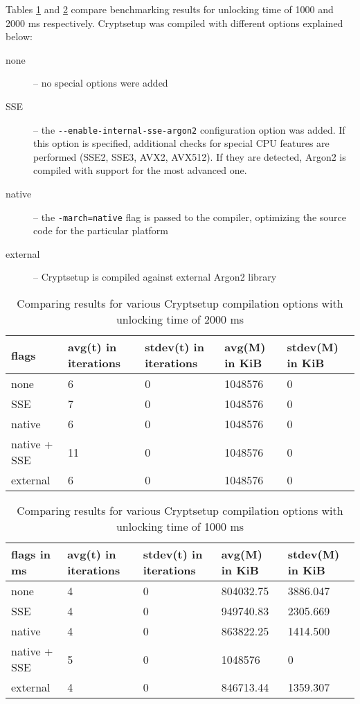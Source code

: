\documentclass[nolof]{fithesis3}
\begin{document}
\FloatBarrier

Tables \ref{tab:comp2000} and \ref{tab:comp1000} compare benchmarking results for unlocking time of 1000 and 2000 ms respectively. Cryptsetup was compiled with different options explained below:

\begin{description}
\item[none] -- no special options were added

\item[SSE] -- the \verb+--enable-internal-sse-argon2+ configuration option was added. If this option is specified, additional checks for special CPU features are performed (SSE2, SSE3, AVX2, AVX512). If they are detected, Argon2 is compiled with support for the most advanced one.

\item[native] -- the \verb+-march=native+ flag is passed to the compiler, optimizing the source code for the particular platform

\item[external] -- Cryptsetup is compiled against external Argon2 library
\end{description}

\noindent
\begin{table}
\caption{Comparing results for various Cryptsetup compilation options with unlocking time of 2000 ms}
\label{tab:comp2000}
\begin{tabularx}{\textwidth}{| l | X | X | X | X |}
\hline
flags & avg(t)  in iterations & stdev(t) in iterations & avg(M) in KiB & stdev(M) in KiB\\
\hline
none & 6 & 0 & 1048576 & 0\\
\hline
SSE & 7 & 0 & 1048576 & 0\\
\hline
native & 6 & 0 & 1048576 & 0\\
\hline
native + SSE & 11 & 0 & 1048576 & 0\\
\hline
external & 6 & 0 & 1048576 & 0\\
\hline
\end{tabularx}
\end{table}

\noindent
\begin{table}
\caption{Comparing results for various Cryptsetup compilation options with unlocking time of 1000 ms}
\label{tab:comp1000}
\begin{tabularx}{\textwidth}{| l | X | X | X | X |}
\hline
flags in ms & avg(t)  in iterations & stdev(t) in iterations & avg(M) in KiB & stdev(M) in KiB\\
\hline
none & 4 & 0 & 804032.75 & 3886.047\\
\hline
SSE & 4 & 0 & 949740.83 & 2305.669\\
\hline
native & 4 & 0 & 863822.25 & 1414.500\\
\hline
native + SSE & 5 & 0 & 1048576 & 0\\
\hline
external & 4 & 0 & 846713.44 & 1359.307\\
\hline
\end{tabularx}
\end{table}
\end{document}
